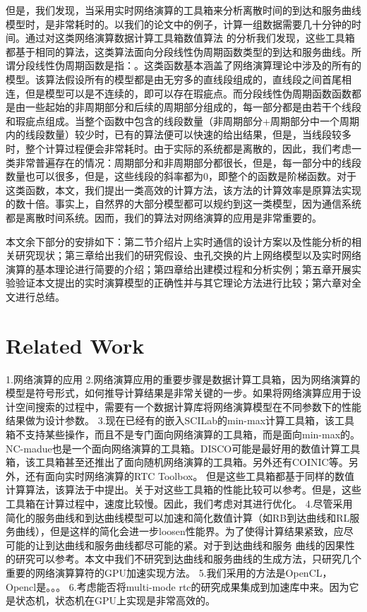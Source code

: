 \documentclass[10pt,journal]{IEEEtran}
\begin{document}
但是，我们发现，当采用实时网络演算的工具箱来分析离散时间的到达和服务曲线模型时，是非常耗时的。以我们的论文中的例子，计算一组数据需要几十分钟的时间。通过对这类网络演算数据计算工具箱数值算法 的分析我们发现，这些工具箱都基于相同的算法\cite{Bouillard2008}，这类算法面向分段线性伪周期函数类型的到达和服务曲线。所谓分段线性伪周期函数是指：。这类函数基本涵盖了网络演算理论中涉及的所有的模型。该算法假设所有的模型都是由无穷多的直线段组成的，直线段之间首尾相连，但是模型可以是不连续的，即可以存在瑕疵点。而分段线性伪周期函数函数都是由一些起始的非周期部分和后续的周期部分组成的，每一部分都是由若干个线段和瑕疵点组成。当整个函数中包含的线段数量（非周期部分+周期部分中一个周期内的线段数量）较少时，已有的算法便可以快速的给出结果，但是，当线段较多时，整个计算过程便会非常耗时。由于实际的系统都是离散的，因此，我们考虑一类非常普遍存在的情况：周期部分和非周期部分都很长，但是，每一部分中的线段数量也可以很多，但是，这些线段的斜率都为0，即整个的函数是阶梯函数。对于这类函数，本文，我们提出一类高效的计算方法，该方法的计算效率是原算法实现的数十倍。事实上，自然界的大部分模型都可以规约到这一类模型，因为通信系统都是离散时间系统。因而，我们的算法对网络演算的应用是非常重要的。

本文余下部分的安排如下：第二节介绍片上实时通信的设计方案以及性能分析的相关研究现状；第三章给出我们的研究假设、虫孔交换的片上网络模型以及实时网络演算的基本理论进行简要的介绍；第四章给出建模过程和分析实例；第五章开展实验验证本文提出的实时演算模型的正确性并与其它理论方法进行比较；第六章对全文进行总结。

\section{Related Work}
1.网络演算的应用
2.网络演算应用的重要步骤是数据计算工具箱，因为网络演算的模型是符号形式，如何推导计算结果是非常关键的一步。如果将网络演算应用于设计空间搜索的过程中，需要有一个数据计算库将网络演算模型在不同参数下的性能结果做为设计参数。
3.现在已经有的嵌入SCILab的min-max计算工具箱，该工具箱不支持某些操作，而且不是专门面向网络演算的工具箱，而是面向min-max的。NC-madue\cite{Boyer2010}也是一个面向网络演算的工具箱。DISCO\cite{5755058,ScZd06}可能是最好用的数值计算工具箱，该工具箱甚至还推出了面向随机网络演算的工具箱。另外还有COINIC等。另外，还有面向实时网络演算的RTC Toolbox\cite{rtc}。 但是这些工具箱都基于同样的数值计算算法，该算法于\cite{Bouillard2008}\cite{bouillard:inria-00123709}中提出。关于对这些工具箱的性能比较可以参考\cite{Boyer2010}。但是，这些工具箱在计算过程中，速度比较慢。因此，我们考虑对其进行优化。
4.尽管采用简化的服务曲线和到达曲线模型可以加速和简化数值计算（如RB到达曲线和RL服务曲线），但是这样的简化会进一步loosen性能界。为了使得计算结果紧致，应尽可能的让到达曲线和服务曲线都尽可能的紧。对于到达曲线和服务 曲线的因果性的研究可以参考。本文中我们不研究到达曲线和服务曲线的生成方法，只研究几个重要的网络演算算符的GPU加速实现方法。
5.我们采用的方法是OpenCL，Opencl是。。。
6.考虑能否将multi-mode rtc的研究成果集成到加速库中来。因为它是状态机，状态机在GPU上实现是非常高效的。
\end{document}
